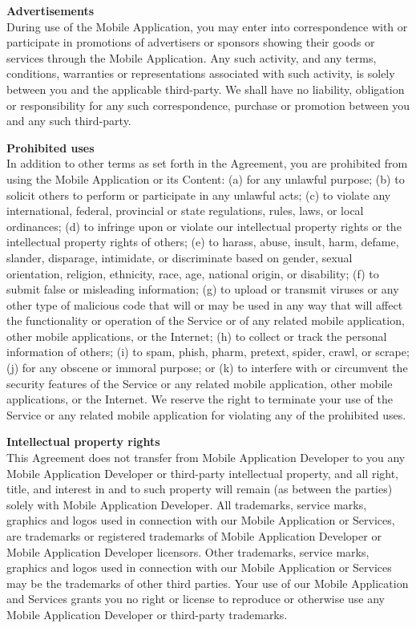 \documentclass[letterpaper,10pt]{article}
\begin{document}
\begin{appendices}
\large{\textbf{Advertisements}} \\
During use of the Mobile Application, you may enter into correspondence with or participate in promotions of advertisers or sponsors showing their goods or services through the Mobile Application. Any such activity, and any terms, conditions, warranties or representations associated with such activity, is solely between you and the applicable third-party. We shall have no liability, obligation or responsibility for any such correspondence, purchase or promotion between you and any such third-party.

\large{\textbf{Prohibited uses}} \\
In addition to other terms as set forth in the Agreement, you are prohibited from using the Mobile Application or its Content: (a) for any unlawful purpose; (b) to solicit others to perform or participate in any unlawful acts; (c) to violate any international, federal, provincial or state regulations, rules, laws, or local ordinances; (d) to infringe upon or violate our intellectual property rights or the intellectual property rights of others; (e) to harass, abuse, insult, harm, defame, slander, disparage, intimidate, or discriminate based on gender, sexual orientation, religion, ethnicity, race, age, national origin, or disability; (f) to submit false or misleading information; (g) to upload or transmit viruses or any other type of malicious code that will or may be used in any way that will affect the functionality or operation of the Service or of any related mobile application, other mobile applications, or the Internet; (h) to collect or track the personal information of others; (i) to spam, phish, pharm, pretext, spider, crawl, or scrape; (j) for any obscene or immoral purpose; or (k) to interfere with or circumvent the security features of the Service or any related mobile application, other mobile applications, or the Internet. We reserve the right to terminate your use of the Service or any related mobile application for violating any of the prohibited uses.

\large{\textbf{Intellectual property rights}} \\
This Agreement does not transfer from Mobile Application Developer to you any Mobile Application Developer or third-party intellectual property, and all right, title, and interest in and to such property will remain (as between the parties) solely with Mobile Application Developer. All trademarks, service marks, graphics and logos used in connection with our Mobile Application or Services, are trademarks or registered trademarks of Mobile Application Developer or Mobile Application Developer licensors. Other trademarks, service marks, graphics and logos used in connection with our Mobile Application or Services may be the trademarks of other third parties. Your use of our Mobile Application and Services grants you no right or license to reproduce or otherwise use any Mobile Application Developer or third-party trademarks.


\end{appendices}
\end{document}

